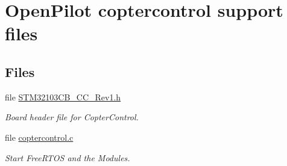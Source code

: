 \hypertarget{group___copter_control}{\section{\-Open\-Pilot coptercontrol support files}
\label{group___copter_control}
}
\subsection*{\-Files}
\begin{DoxyCompactItemize}
\item 
file \hyperlink{_s_t_m32103_c_b___c_c___rev1_8h}{\-S\-T\-M32103\-C\-B\-\_\-\-C\-C\-\_\-\-Rev1.\-h}
\begin{DoxyCompactList}\small\item\em \-Board header file for \-Copter\-Control. \end{DoxyCompactList}\item 
file \hyperlink{coptercontrol_8c}{coptercontrol.\-c}
\begin{DoxyCompactList}\small\item\em \-Start \-Free\-R\-T\-O\-S and the \-Modules. \end{DoxyCompactList}\end{DoxyCompactItemize}
